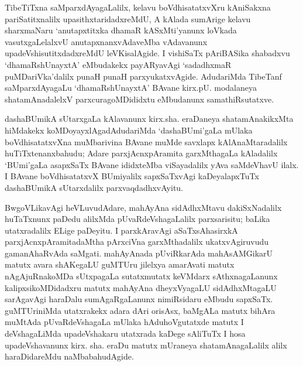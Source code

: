 TibeTiTxna saMparxdAyagaLalilx, kelavu boVdhisatatxvXru kAniSakxna pariSatitxnalilx upa\-sithxta\-ridadxreMdU, A kAlada sumArige kelavu sharxmaNaru `anutapxtitxka dhamaR kASxMti'yanunx loVkada vasutxgaLelalxvU anutapxnanxvAdaveMba vAdavanunx upadeVshisutitxdadxreMdU leVKisalAgide. I vishiSaTx pAriBASika shabadxvu `dhamaRshUnayxtA' eMbudakekx payARya\-vAgi `sadadhxmaR puMDariVka'dalilx punaH punaH parxyukatxvAgide. AdudariMda TibeTanf saMparxdAyagaLu `dhamaRshUnayxtA' BAvane kirx.pU. modalaneya shatamAnadalelxV parxcuragoMDididxtu eMbudanunx samathiRsutatxve.

dashaBUmikA sUtarxgaLa kAlavanunx kirx.sha. eraDaneya shatamAnakikxMta hiMdakekx koMDoyayxlAgadAdudariMda `dashaBUmi'gaLa mUlaka boVdhisatatxvXna muMbarivina BAvane muMde savxlapx kAlAnaMtaradalilx huTiTxtenanxbahudu; Adare parxjAcnxpAramita garxMthagaLa kAladalilx `BUmi'gaLa asapxSaTx BAvane ididxteMba viSayadalilx yAva saMdeVhavU ilalx. I BAvane boVdhisatatxvX BUmiyalilx sapxSaTxvAgi kaDeyalapxTuTx dashaBUmikA sUtarxdalilx parxvaqdadhxvAyitu.

BwgoVLikavAgi heVLuvudAdare, mahAyAna sidAdhxMtavu dakiSxNadalilx huTaTxnunx paDedu alilxMda pUvaRdeVshagaLalilx parxsarisitu; baLika utatxradalilx ELige paDeyitu. I parxkAravAgi aSaTxsAhasirxkA parxjAcnxpAramitadaMtha pArxciVna garxMthadalilx ukatxvAgi\-ruvudu gamanAhaRvAda saMgati. mahAyAnada pUviRkarAda mahAsAMGikarU matutx avara shAKegaLU guMTUru jilelxya amarAvati matutx nAgAjuRnakoMDa sUtxpagaLa sutatxmutatx keVMdarx sAthxnagaLanunx kalipxsikoMDidadxru matutx mahAyAna dheyxVyagaLU sidAdhxMtagaLU sarAgavAgi haraDalu sumAgaRgaLanunx nimiRsidaru eMbudu sapxSaTx. guMTUriniMda utatxrakekx adara dAri orisAsx, baMgALa matutx bihAra muMtAda pUvaRdeVshagaLa mUlaka hAduhoVgutatxde matutx I deVshagaLiMda upadeVshakaru utatxrada kaDege sAliTuTx I hosa upadeVshavanunx kirx. sha. eraDu matutx mUraneya shatamAnagaLalilx alilx haraDidareMdu naMbabahudAgide.

\theendnotes
{}
